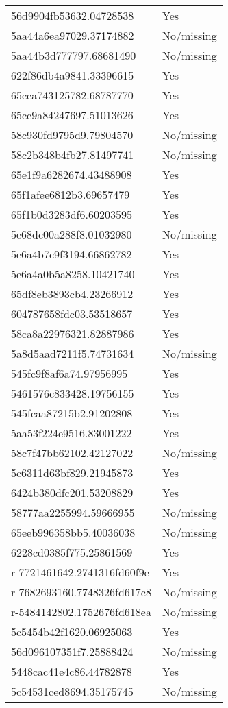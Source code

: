 \begin{tabular}{ll}
56d9904fb53632.04728538 & Yes \\
5aa44a6ea97029.37174882 & No/missing \\
5aa44b3d777797.68681490 & No/missing \\
622f86db4a9841.33396615 & Yes \\
65cca743125782.68787770 & Yes \\
65cc9a84247697.51013626 & Yes \\
58c930fd9795d9.79804570 & No/missing \\
58c2b348b4fb27.81497741 & No/missing \\
65e1f9a6282674.43488908 & Yes \\
65f1afee6812b3.69657479 & Yes \\
65f1b0d3283df6.60203595 & Yes \\
5e68dc00a288f8.01032980 & No/missing \\
5e6a4b7c9f3194.66862782 & Yes \\
5e6a4a0b5a8258.10421740 & Yes \\
65df8eb3893cb4.23266912 & Yes \\
604787658fdc03.53518657 & Yes \\
58ca8a22976321.82887986 & Yes \\
5a8d5aad7211f5.74731634 & No/missing \\
545fc9f8af6a74.97956995 & Yes \\
5461576c833428.19756155 & Yes \\
545fcaa87215b2.91202808 & Yes \\
5aa53f224e9516.83001222 & Yes \\
58c7f47bb62102.42127022 & No/missing \\
5c6311d63bf829.21945873 & Yes \\
6424b380dfc201.53208829 & Yes \\
58777aa2255994.59666955 & No/missing \\
65eeb996358bb5.40036038 & No/missing \\
6228cd0385f775.25861569 & Yes \\
r-7721461642.2741316fd60f9e & Yes \\
r-7682693160.7748326fd617c8 & No/missing \\
r-5484142802.1752676fd618ea & No/missing \\
5c5454b42f1620.06925063 & Yes \\
56d096107351f7.25888424 & No/missing \\
5448cac41e4c86.44782878 & Yes \\
5c54531ced8694.35175745 & No/missing \\

\end{tabular}
